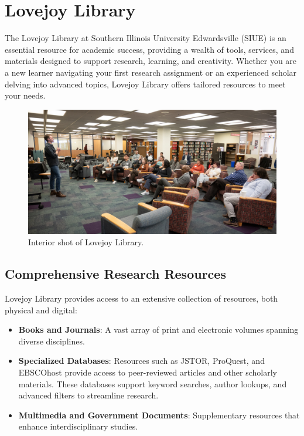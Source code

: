 \documentclass[
]{book}
\providecommand{\tightlist}{%
  \setlength{\itemsep}{0pt}\setlength{\parskip}{0pt}}
\begin{document}
\section{Lovejoy Library}\label{lovejoy-library}

The Lovejoy Library at Southern Illinois University Edwardsville (SIUE) is an essential resource for academic success, providing a wealth of tools, services, and materials designed to support research, learning, and creativity. Whether you are a new learner navigating your first research assignment or an experienced scholar delving into advanced topics, Lovejoy Library offers tailored resources to meet your needs.

\begin{figure}
\centering
\includegraphics[width=1\linewidth,height=\textheight,keepaspectratio]{images/lovejoy.png}
\caption{Interior shot of Lovejoy Library.}
\end{figure}

\subsection*{Comprehensive Research Resources}\label{comprehensive-research-resources}

Lovejoy Library provides access to an extensive collection of resources, both physical and digital:

\begin{itemize}
\tightlist
\item
  \textbf{Books and Journals}: A vast array of print and electronic volumes spanning diverse disciplines.
\item
  \textbf{Specialized Databases}: Resources such as JSTOR, ProQuest, and EBSCOhost provide access to peer-reviewed articles and other scholarly materials. These databases support keyword searches, author lookups, and advanced filters to streamline research.
\item
  \textbf{Multimedia and Government Documents}: Supplementary resources that enhance interdisciplinary studies.
\end{itemize}
\end{document}
